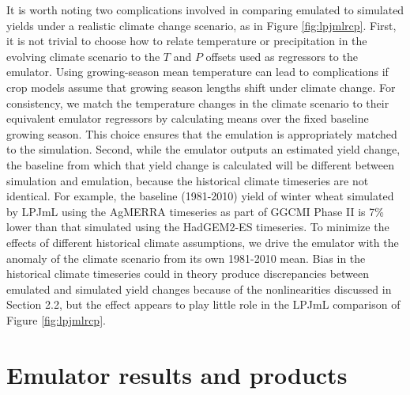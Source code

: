 \documentclass[gmd, manuscript]{copernicus} %
\begin{document}
It is worth noting two complications involved in comparing emulated to simulated yields under a realistic climate change scenario, as in Figure \ref{fig:lpjmlrcp}.
First, it is not trivial to choose how to relate temperature or precipitation in the evolving climate scenario to the $T$ and $P$ offsets used as regressors to the emulator. 
Using growing-season mean temperature can lead to complications if crop models assume that growing season lengths shift under climate change. 
For consistency, we match the temperature changes in the climate scenario to their equivalent emulator regressors by calculating means over the fixed baseline growing season. 
This choice ensures that the emulation is appropriately matched to the simulation.
Second, while the emulator outputs an estimated yield change, the baseline from which that yield change is calculated will be different between simulation and emulation, because the historical climate timeseries are not identical. For example, the baseline (1981-2010) yield of winter wheat simulated by LPJmL using the AgMERRA timeseries as part of GGCMI Phase II is 7\% lower than that simulated using the HadGEM2-ES timeseries. 
To minimize the effects of different historical climate assumptions, we drive the emulator with the anomaly of the climate scenario from its own 1981-2010 mean. 
Bias in the historical climate timeseries could in theory produce discrepancies between emulated and simulated yield changes because of the nonlinearities discussed in Section 2.2, but the effect appears to play little role in the LPJmL comparison of Figure \ref{fig:lpjmlrcp}. 

\section{Emulator results and products}
\label{S:5}
\end{document}
